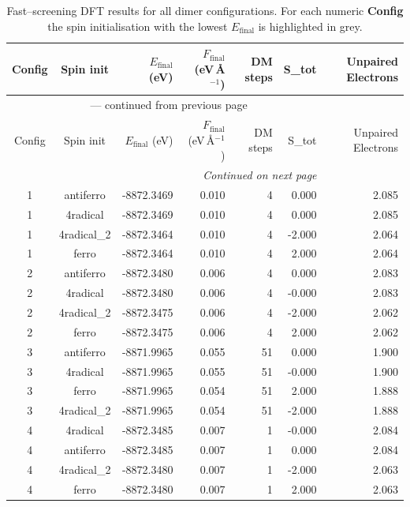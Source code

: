 
\begin{longtable}{@{}ccrrrrr@{}}
\caption{Fast–screening DFT results for all dimer configurations.
         For each numeric \textbf{Config} the spin initialisation with the
         lowest $E_{\mathrm{final}}$ is highlighted in grey.}\label{tab:dimer_full}\\
\toprule
Config & Spin init & $E_{\mathrm{final}}$ (eV) &
$F_{\mathrm{final}}$ (eV\,\AA$^{-1}$) & DM steps & S_{tot} & Unpaired Electrons\\
\midrule
\endfirsthead
\multicolumn{6}{c}{{\tablename}~\thetable{} — continued from previous page}\\
\toprule
Config & Spin init & $E_{\mathrm{final}}$ (eV) &
$F_{\mathrm{final}}$ (eV\,\AA$^{-1}$) & DM steps & S_{tot} & Unpaired Electrons\\
\midrule
\endhead
\midrule
\multicolumn{6}{r}{\emph{Continued on next page}}\\
\endfoot
\bottomrule
\endlastfoot
\rowcolor{gray!20} 1 & antiferro & -8872.3469 & 0.010 & 4 & 0.000 & 2.085 \\
1 & 4radical & -8872.3469 & 0.010 & 4 & 0.000 & 2.085 \\
1 & 4radical\_2 & -8872.3464 & 0.010 & 4 & -2.000 & 2.064 \\
1 & ferro & -8872.3464 & 0.010 & 4 & 2.000 & 2.064 \\
\rowcolor{gray!20} 2 & antiferro & -8872.3480 & 0.006 & 4 & 0.000 & 2.083 \\
2 & 4radical & -8872.3480 & 0.006 & 4 & -0.000 & 2.083 \\
2 & 4radical\_2 & -8872.3475 & 0.006 & 4 & -2.000 & 2.062 \\
2 & ferro & -8872.3475 & 0.006 & 4 & 2.000 & 2.062 \\
\rowcolor{gray!20} 3 & antiferro & -8871.9965 & 0.055 & 51 & 0.000 & 1.900 \\
3 & 4radical & -8871.9965 & 0.055 & 51 & -0.000 & 1.900 \\
3 & ferro & -8871.9965 & 0.054 & 51 & 2.000 & 1.888 \\
3 & 4radical\_2 & -8871.9965 & 0.054 & 51 & -2.000 & 1.888 \\
\rowcolor{gray!20} 4 & 4radical & -8872.3485 & 0.007 & 1 & -0.000 & 2.084 \\
4 & antiferro & -8872.3485 & 0.007 & 1 & 0.000 & 2.084 \\
4 & 4radical\_2 & -8872.3480 & 0.007 & 1 & -2.000 & 2.063 \\
4 & ferro & -8872.3480 & 0.007 & 1 & 2.000 & 2.063 \\

\end{longtable}
